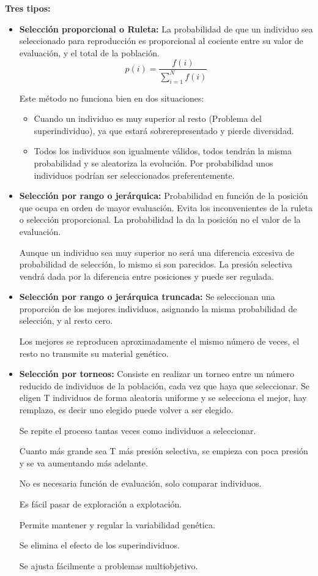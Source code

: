\documentclass[12pt, twoside, openright]{report} %
\begin{document}
\textbf{Tres tipos:}
\begin{itemize}
	\item \textbf{Selección proporcional o Ruleta:} La probabilidad de que un individuo sea seleccionado para reproducción es proporcional al cociente entre su valor de evaluación, y el total de la población.
	      $$p(i)=\frac{f(i)}{\sum^N_{i=1} f(i)}$$
	      \pagebreak
	      
	      Este método no funciona bien en dos situaciones:
	      \begin{itemize}
		      \item Cuando un individuo es muy superior al resto (Problema del superindividuo), ya que estará sobrerepresentado y pierde diversidad.
		      \item Todos los individuos son igualmente válidos, todos tendrán la misma probabilidad y se aleatoriza la evolución. Por probabilidad unos individuos podrían ser seleccionados preferentemente.
	      \end{itemize}
	\item \textbf{Selección por rango o jerárquica:} Probabilidad en función de la posición que ocupa en orden de mayor evaluación. Evita los inconvenientes de la ruleta o selección proporcional. La probabilidad la da la posición no el valor de la evaluación.
	      
	      Aunque un individuo sea muy superior no será una diferencia excesiva de probabilidad de selección, lo mismo si son parecidos. La presión selectiva vendrá dada por la diferencia entre posiciones y puede ser regulada.
	\item \textbf{Selección por rango o jerárquica truncada:} Se seleccionan una proporción de los mejores individuos, asignando la misma probabilidad de selección, y al resto cero.
	      
	      Los mejores se reproducen aproximadamente el mismo número de veces, el resto no transmite su material genético.
	\item \textbf{Selección por torneos:} Consiste en realizar un torneo entre un número reducido de
	      individuos de la población, cada vez que haya que seleccionar. Se eligen T individuos de forma aleatoria uniforme y se selecciona el mejor, hay remplazo, es decir uno elegido puede volver a ser elegido.
	      
	      Se repite el proceso tantas veces como individuos a seleccionar.
	      
	      Cuanto más grande sea T más presión selectiva, se empieza con poca presión y se va aumentando más adelante.
	      
	      No es necesaria función de evaluación, solo comparar individuos.
	      
	      Es fácil pasar de exploración a explotación.
	      
	      Permite mantener y regular la variabilidad genética.
	      
	      Se elimina el efecto de los superindividuos.
	      
	      Se ajusta fácilmente a problemas multiobjetivo.
\end{itemize}
\end{document}
